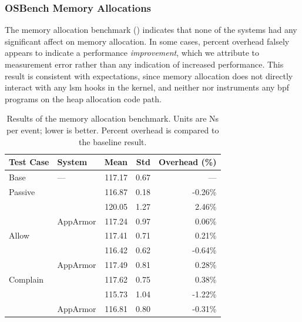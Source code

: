 \subsubsection{OSBench Memory Allocations}

The memory allocation benchmark () indicates that none of the
systems had any significant affect on memory allocation. In some cases, percent overhead
falsely appears to indicate a performance \textit{improvement}, which we attribute to
measurement error rather than any indication of increased performance. This result is
consistent with expectations, since memory allocation does not directly interact with any
\gls{lsm} hooks in the kernel, and neither \bpfbox{} nor \bpfcontain{} instruments any
\gls{bpf} programs on the heap allocation code path.


\begingroup\small
\begin{longtable}[c]{llrrr}
  \caption[Results of the memory allocation benchmark]{
    Results of the memory allocation benchmark. Units are Ns per event; lower is
    better. Percent overhead is compared to the baseline result.
  }%
  \label{tab:phoronix-memory}\\
  \toprule
   Test Case & System         &  Mean  & Std  & Overhead (\%)\\
   \midrule
   Base      & ---            & 117.17 & 0.67 & ---     \\
   \midrule
   Passive   & \bpfbox{}      & 116.87 & 0.18 & -0.26\% \\
             & \bpfcontain{}  & 120.05 & 1.27 &  2.46\% \\
             & AppArmor       & 117.24 & 0.97 &  0.06\% \\
   \midrule
   Allow     & \bpfbox{}      & 117.41 & 0.71 &  0.21\% \\
             & \bpfcontain{}  & 116.42 & 0.62 & -0.64\% \\
             & AppArmor       & 117.49 & 0.81 &  0.28\% \\
   \midrule
   Complain  & \bpfbox{}      & 117.62 & 0.75 &  0.38\% \\
             & \bpfcontain{}  & 115.73 & 1.04 & -1.22\% \\
             & AppArmor       & 116.81 & 0.80 & -0.31\% \\
  \bottomrule
\end{longtable}
\endgroup


